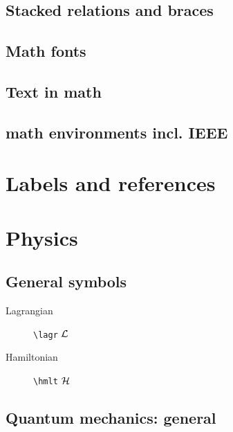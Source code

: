 \documentclass[a4paper]{article}
\begin{document}
\subsection{Stacked relations and braces}


\subsection{Math fonts}


\subsection{Text in math}

\subsection{math environments incl. IEEE}


\section{Labels and references}

\section{Physics}

\subsection{General symbols}

\begin{description}
	\item[Lagrangian] \verb|\lagr| \quad $\mathcal{L}$
	\item[Hamiltonian] \verb|\hmlt| \quad $\mathcal{H}$
\end{description}


\subsection{Quantum mechanics: general}
\end{document}
